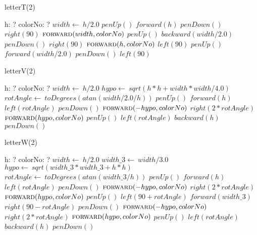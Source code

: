 \documentclass[a4paper,10pt]{article}
\begin{document}
\begin{algorithm}
\caption{letterT(2)}
\begin{algorithmic}[5]
\State {}
\State {}
    \State h: ?
    \State colorNo: ?
  \EndDecl
  \State \(width\gets\ h/2.0\)
  \State \(penUp()\)
  \State \(forward(h)\)
  \State \(penDown()\)
  \State \(right(90)\)
  \State \(\Call{forward}{width,colorNo}\)
  \State \(penUp()\)
  \State \(backward(width/2.0)\)
  \State \(penDown()\)
  \State \(right(90)\)
  \State \(\Call{forward}{h,colorNo}\)
  \State \(left(90)\)
  \State \(penUp()\)
  \State \(forward(width/2.0)\)
  \State \(penDown()\)
  \State \(left(90)\)
\EndProcedure
\end{algorithmic}
\end{algorithm}


\begin{algorithm}
\caption{letterV(2)}
\begin{algorithmic}[5]
\State {}
\State {}
    \State h: ?
    \State colorNo: ?
  \EndDecl
  \State \(width\gets\ h/2.0\)
  \State \(hypo\gets\ sqrt(h*h+width*width/4.0)\)
  \State \(rotAngle\gets\ toDegrees(atan(width/2.0/h))\)
  \State \(penUp()\)
  \State \(forward(h)\)
  \State \(left(rotAngle)\)
  \State \(penDown()\)
  \State \(\Call{forward}{-hypo,colorNo}\)
  \State \(right(2*rotAngle)\)
  \State \(\Call{forward}{hypo,colorNo}\)
  \State \(penUp()\)
  \State \(left(rotAngle)\)
  \State \(backward(h)\)
  \State \(penDown()\)
\EndProcedure
\end{algorithmic}
\end{algorithm}


\begin{algorithm}
\caption{letterW(2)}
\begin{algorithmic}[5]
\State {}
\State {}
    \State h: ?
    \State colorNo: ?
  \EndDecl
  \State \(width\gets\ h/2.0\)
  \State \(width\_3\gets\ width/3.0\)
  \State \(hypo\gets\ sqrt(width\_3*width\_3+h*h)\)
  \State \(rotAngle\gets\ toDegrees(atan(width\_3/h))\)
  \State \(penUp()\)
  \State \(forward(h)\)
  \State \(left(rotAngle)\)
  \State \(penDown()\)
  \State \(\Call{forward}{-hypo,colorNo}\)
  \State \(right(2*rotAngle)\)
  \State \(\Call{forward}{hypo,colorNo}\)
  \State \(penUp()\)
  \State \(left(90+rotAngle)\)
  \State \(forward(width\_3)\)
  \State \(right(90-rotAngle)\)
  \State \(penDown()\)
  \State \(\Call{forward}{-hypo,colorNo}\)
  \State \(right(2*rotAngle)\)
  \State \(\Call{forward}{hypo,colorNo}\)
  \State \(penUp()\)
  \State \(left(rotAngle)\)
  \State \(backward(h)\)
  \State \(penDown()\)
\EndProcedure
\end{algorithmic}
\end{algorithm}
\end{document}
